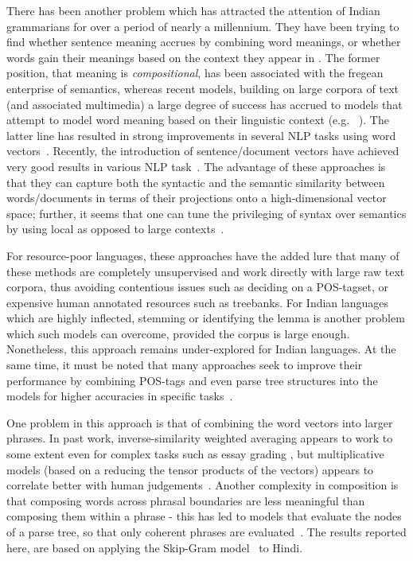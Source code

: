 There has been another problem which has attracted the attention of Indian grammarians for over a period of nearly a millennium. They have been trying to find whether sentence meaning accrues by combining word meanings, or whether words gain their meanings based on the context they appear in \cite{Matilal:90}.  The former position, that meaning is {\em compositional}, has been associated with the fregean enterprise of semantics, whereas recent models, building on large corpora of text (and associated multimedia) a large degree of success has accrued to models that attempt to model word meaning based on their linguistic context (e.g. ~\cite{Landauer:97}). The latter line has resulted in strong improvements in several NLP tasks using word vectors~\cite{Collobert:08,Turian:10,Mikolov:13a,Socher:13}. Recently, the introduction of sentence/document vectors have achieved very good results in various NLP task~\cite{Le:14}. The advantage of these approaches is that they can capture both the syntactic and the semantic similarity between words/documents in terms of their projections onto a high-dimensional vector space; further, it seems that one can tune the privileging of syntax over semantics by using local as opposed to large contexts~\cite{Huang:12}. 

For resource-poor languages, these approaches have the added lure that many of these methods are completely unsupervised and work directly with large raw text corpora, thus avoiding contentious issues such as deciding on a POS-tagset, or expensive human annotated resources such as treebanks.  For Indian languages which are highly inflected, stemming or identifying the lemma is another problem
which such models can overcome, provided the corpus is large enough. Nonetheless, this approach remains under-explored for Indian languages. At the same time, it must be noted that many approaches seek to improve their performance by combining POS-tags and even parse tree structures into the models for higher accuracies in specific tasks~\cite{Socher:13}. 

One problem in this approach is that of  combining the word vectors into larger phrases. In past work, inverse-similarity weighted averaging appears to work to some extent even for complex tasks such as essay grading \cite{Landauer:03}, but multiplicative models (based on a reducing the tensor products of the vectors) appears to correlate better with human judgements~\cite{Mitchell:08,Socher:13}.
Another complexity in composition is that composing words across phrasal boundaries are less meaningful than composing them within a phrase - this has led to models that evaluate the nodes of a parse tree, so that only coherent phrases are evaluated~\cite{Socher:13}. The results reported here, are based on applying the Skip-Gram  model~\cite{Mikolov:13b} to Hindi. 

